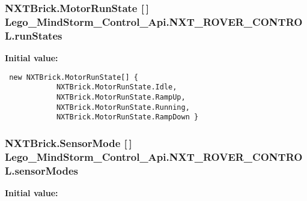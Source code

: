 \hypertarget{class_lego___mind_storm___control___api_1_1_n_x_t___r_o_v_e_r___c_o_n_t_r_o_l_9bf644fd25ad52c424fc34424082ba8b}{
\subsubsection[{runStates}]{\setlength{\rightskip}{0pt plus 5cm}NXTBrick.MotorRunState \mbox{[}$\,$\mbox{]} {\bf Lego\_\-MindStorm\_\-Control\_\-Api.NXT\_\-ROVER\_\-CONTROL.runStates}}}
\label{class_lego___mind_storm___control___api_1_1_n_x_t___r_o_v_e_r___c_o_n_t_r_o_l_9bf644fd25ad52c424fc34424082ba8b}


\textbf{Initial value:}

\begin{Code}\begin{verbatim} new NXTBrick.MotorRunState[] {
            NXTBrick.MotorRunState.Idle,
            NXTBrick.MotorRunState.RampUp,
            NXTBrick.MotorRunState.Running,
            NXTBrick.MotorRunState.RampDown }
\end{verbatim}
\end{Code}
\hypertarget{class_lego___mind_storm___control___api_1_1_n_x_t___r_o_v_e_r___c_o_n_t_r_o_l_6306b75573ca70bd6e793ccbf97200a5}{
\subsubsection[{sensorModes}]{\setlength{\rightskip}{0pt plus 5cm}NXTBrick.SensorMode \mbox{[}$\,$\mbox{]} {\bf Lego\_\-MindStorm\_\-Control\_\-Api.NXT\_\-ROVER\_\-CONTROL.sensorModes}}}
\label{class_lego___mind_storm___control___api_1_1_n_x_t___r_o_v_e_r___c_o_n_t_r_o_l_6306b75573ca70bd6e793ccbf97200a5}


\textbf{Initial value:}

